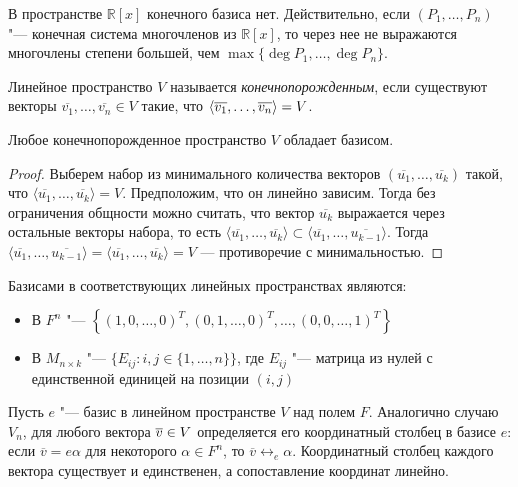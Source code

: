 \begin{note}
	В пространстве $\mathbb{R}[x]$ конечного базиса нет. Действительно, если $(P_1, \dots, P_n)$ "--- конечная система многочленов из $\mathbb{R}[x]$, то через нее не выражаются многочлены степени большей, чем $\max\{\deg{P_1}, \dots, \deg{P_n}\}$.
\end{note}

\begin{definition}
	Линейное пространство $V$ называется \textit{конечнопорожденным}, если существуют векторы $\overline{v_1}, \dots, \overline{v_n} \in V$ такие, что $ \langle\overline{v_1}, \dots, \overline{v_n}\rangle \hm{=} V$.
\end{definition}

\begin{proposition}
	Любое конечнопорожденное пространство $V$ обладает базисом.
\end{proposition}

\begin{proof}
	Выберем набор из минимального количества векторов $(\overline{u_1}, \dots, \overline{u_k})$ такой, что $\langle\overline{u_1}, \dots, \overline{u_k}\rangle = V$. Предположим, что он линейно зависим. Тогда без ограничения общности можно считать, что вектор $\overline{u_k}$ выражается через остальные векторы набора, то есть $\langle\overline{u_1}, \dots, \overline{u_k}\rangle \subset \langle\overline{u_1}, \dots, \overline{u_{k-1}}\rangle$. Тогда $\langle\overline{u_1}, \dots, \overline{u_{k - 1}}\rangle = \langle\overline{u_1}, \dots, \overline{u_k}\rangle = V$ --- противоречие с минимальностью.
\end{proof}

\begin{example}
	Базисами в соответствующих линейных пространствах являются:
	\begin{itemize}
		\item В $F^n$ "--- $\left\{(1, 0, \dotsc, 0)^T, (0, 1, \dotsc, 0)^T, \dotsc, (0, 0, \dotsc, 1)^T\right\}$
		\item В $M_{n \times k}$ "--- $\{E_{ij} : i, j \in \{1, \dotsc, n\}\}$, где $E_{ij}$ "--- матрица из нулей с единственной единицей на позиции $(i, j)$
	\end{itemize}
\end{example}

\begin{note}
	Пусть $e$ "--- базис в линейном пространстве $V$ над полем $F$. Аналогично случаю $V_n$, для любого вектора $\overline{v} \hm{\in} V$ определяется его координатный столбец в базисе $e$: если $\overline{v} = e\alpha$ для некоторого $\alpha \in F^n$, то $\overline{v} \leftrightarrow_{e} \alpha$. Координатный столбец каждого вектора существует и единственен, а сопоставление координат линейно.
\end{note}


